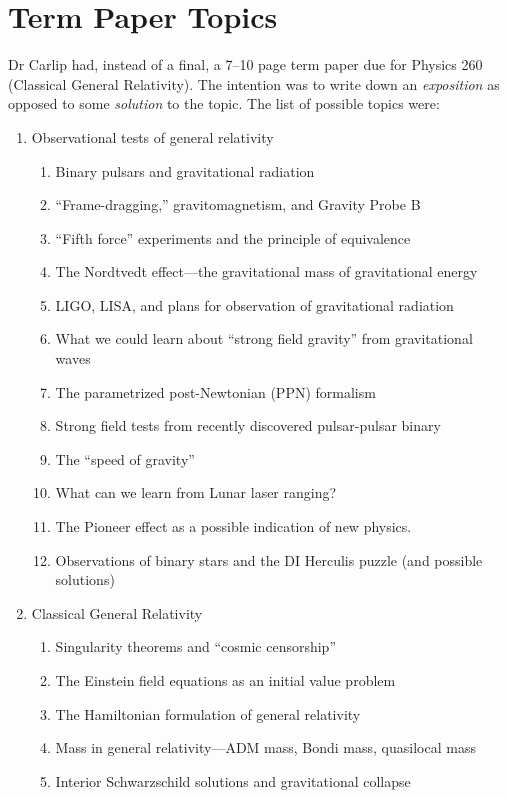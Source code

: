 \section{Term Paper Topics}

Dr Carlip had, instead of a final, a 7--10 page term paper due for
Physics 260 (Classical General Relativity). The intention was to write
down an \emph{exposition} as opposed to some \emph{solution} to the
topic. The list of possible topics were:
\begin{enumerate}
\item Observational tests of general relativity
  \begin{enumerate}
  \item Binary pulsars and gravitational radiation
  \item ``Frame-dragging,'' gravitomagnetism, and Gravity Probe B
  \item ``Fifth force'' experiments and the principle of equivalence
  \item The Nordtvedt effect---the gravitational mass of gravitational energy
  \item LIGO, LISA, and plans for observation of gravitational radiation
  \item What we could learn about ``strong field gravity'' from
    gravitational waves
  \item The parametrized post-Newtonian (PPN) formalism
  \item Strong field tests from recently discovered pulsar-pulsar binary
  \item The ``speed of gravity''
  \item What can we learn from Lunar laser ranging?
  \item The Pioneer effect as a possible indication of new physics.
  \item Observations of binary stars and the DI Herculis puzzle (and
    possible solutions)
  \end{enumerate}
\item Classical General Relativity
  \begin{enumerate}
  \item Singularity theorems and ``cosmic censorship''
  \item The Einstein field equations as an initial value problem
  \item The Hamiltonian formulation of general relativity
  \item Mass in general relativity---ADM mass, Bondi mass, quasilocal mass
  \item Interior Schwarzschild solutions and gravitational collapse

\end{enumerate}
\end{enumerate}
